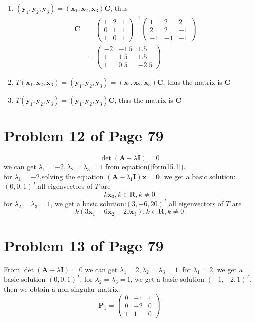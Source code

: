 \documentclass[12pt,a4paper]{article}
\newcommand{\mysection}[2]{
\section{Problem #1 of Page #2}	
	}
\begin{document}
\begin{enumerate}[(1)]
\item  $(\bm{y}_1,\bm{y}_2,\bm{y}_3) = (\bm{x}_1,\bm{x}_2,\bm{x}_3) \bm{C}$,
thus 
\[
\begin{split}
\bm{C} &= \left(\begin{array}{ccc}
1 & 2 & 1\\
0 & 1 & 1 \\
1 & 0 & 1
\end{array} \right)^{-1} \left(\begin{array}{ccc}
1 & 2 &2\\
2 & 2 &-1\\
-1& -1&-1
\end{array} 
\right) \\
&= \left(\begin{array}{ccc} 
-2 & -1.5 & 1.5 \\
1 & 1.5 &1.5 \\
1 &0.5&-2.5
\end{array} 
\right) 
\end{split} 
\]
\item  $T(\bm{x}_1,\bm{x}_2,\bm{x}_3) =(\bm{y}_1,\bm{y}_2,\bm{y}_3)
= (\bm{x}_1,\bm{x}_2,\bm{x}_3) \bm{C}$,
 thus the matrix is $\bm{C}$
\item $T(\bm{y}_1,\bm{y}_2,\bm{y}_3) = (\bm{y}_1,\bm{y}_2,\bm{y}_3) \bm{C}$,
thus the matrix is $\bm{C}$
\end{enumerate} 
\mysection{12}{79}
\begin{equation}
\label{form15.1}
\det (\bm{A} - \lambda \bm{I}) = 0
\end{equation}
we can get $\lambda_1 = -2,\lambda_2 = \lambda_3 = 1$ from equation(\ref{form15.1}).\\
for $\lambda_1 = -2 $,solving the equation $(\bm{A} - \lambda_1 \bm{I})\bm{x} = \bm{0}$,
we get a basic solution:$(0,0,1)^{T} $.all eigenvectors of $T$ are 
\[
k\bm{x}_3, k \in \mathbf{R}, k \neq 0
\]
for $\lambda_2 = \lambda_3 = 1$, we get a basic solution:$(3,-6,20)^{T}$,all eigenvectors of $T$
are 
\[
k(3\bm{x}_1 - 6\bm{x}_2 + 20\bm{x}_3), k \in \mathbf{R}, k \neq 0
\]
\mysection{13}{79}
\qquad From $\det(\bm{A}-\lambda\bm{I}) = 0$  we can get $\lambda_1 = 2,\lambda_2 = \lambda_3 =1$.
for $\lambda_1 = 2$, we get a basic solution $(0,0,1)^{T}$;
for $\lambda_2 = \lambda_3 = 1$, we get a basic solution $(-1,-2,1)^{T}$.
then we obtain a non-singular matrix:
\[
\bm{P}_1 = \left( \begin{array}{ccc}
0 & -1 & 1 \\
0 & -2 & 0\\
1 & 1  & 0
\end{array} 
\right) 
\]
\end{document}
